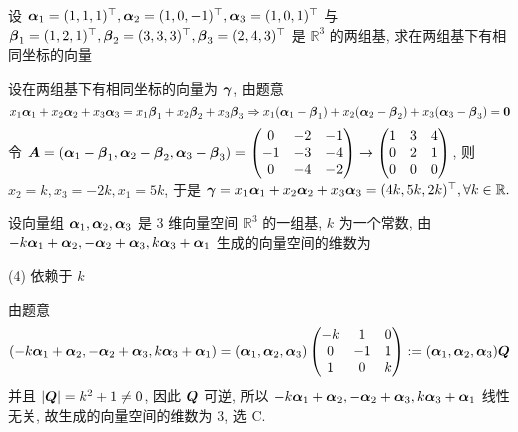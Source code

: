 \begin{example}
    设 $\vb*{\alpha}_1=(1,1,1)^\top, \vb*{\alpha}_2=(1,0,-1)^\top, \vb*{\alpha}_3=(1,0,1)^\top$ 与 $\vb*{\beta}_1=(1,2,1)^\top, \vb*{\beta}_2=(3,3,3)^\top, \vb*{\beta}_3=(2,4,3)^\top$ 是 $\mathbb{R}^3$ 的两组基, 求在两组基下有相同坐标的向量
\end{example}
\begin{solution}
    设在两组基下有相同坐标的向量为 $\vb*{\gamma}$, 由题意
    $$
    x_1\vb*{\alpha}_1+x_2\vb*{\alpha}_2+x_3\vb*{\alpha}_3=x_1\vb*{\beta}_1+ x_2\vb*{\beta}_2+ x_3\vb*{\beta}_3\Rightarrow x_1(\vb*{\alpha}_1-\vb*{\beta}_1)+ x_2(\vb*{\alpha}_2-\vb*{\beta}_2)+ x_3(\vb*{\alpha}_3-\vb*{\beta}_3)=\vb*{0}
    $$
    令 $\vb*{A}=(\vb*{\alpha}_1-\vb*{\beta}_1,\vb*{\alpha}_2-\vb*{\beta}_2,\vb*{\alpha}_3-\vb*{\beta}_3)=\begin{pmatrix} 0 & -2 & -1 \\ -1 & -3 & -4 \\ 0 & -4 & -2 \\\end{pmatrix}\to \begin{pmatrix} 1 & 3 & 4 \\ 0 & 2 & 1 \\ 0 & 0 & 0 \\\end{pmatrix}$,
    则 $x_2=k, x_3=-2k, x_1=5k$, 于是 $\vb*{\gamma}=x_1\vb*{\alpha}_1+ x_2\vb*{\alpha}_2+ x_3\vb*{\alpha}_3=(4k,5k,2k)^\top, \forall k\in \mathbb{R}.$
\end{solution}

\begin{example}
    设向量组 $\vb*{\alpha}_1, \vb*{\alpha}_2, \vb*{\alpha}_3$ 是 3 维向量空间 $\mathbb{R}^3$ 的一组基, $k$ 为一个常数, 由 $-k\vb*{\alpha}_1+\vb*{\alpha}_2,-\vb*{\alpha}_2+\vb*{\alpha}_3, k\vb*{\alpha}_3+\vb*{\alpha}_1$ 生成的向量空间的维数为 
    \begin{tasks}(4)
        \task 依赖于 $k$
    \end{tasks}
\end{example}
\begin{solution}
    由题意 
    $$
    (-k\vb*{\alpha}_1+\vb*{\alpha}_2,-\vb*{\alpha}_2+\vb*{\alpha}_3, k\vb*{\alpha}_3+\vb*{\alpha}_1)=(\vb*{\alpha}_1, \vb*{\alpha}_2, \vb*{\alpha}_3)\begin{pmatrix} -k & 1 & 0 \\ 0 & -1 & 1 \\ 1 & 0 & k \\\end{pmatrix}:=(\vb*{\alpha}_1, \vb*{\alpha}_2, \vb*{\alpha}_3)\vb*{Q}
    $$
    并且 $|\vb*{Q}|=k^2+1\neq 0$, 因此 $\vb*{Q}$ 可逆, 所以 $-k\vb*{\alpha}_1+\vb*{\alpha}_2,-\vb*{\alpha}_2+\vb*{\alpha}_3, k\vb*{\alpha}_3+\vb*{\alpha}_1$ 线性无关, 故生成的向量空间的维数为 $3$, 选 C.
\end{solution}

